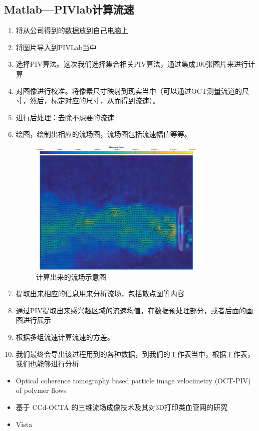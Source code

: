 \documentclass[12pt]{article}
\begin{document}
\subsection{Matlab—PIVlab计算流速}
\begin{enumerate}
    \item 将从公司得到的数据放到自己电脑上
    \item 将图片导入到PIVLab当中
    \item 选择PIV算法。这次我们选择集合相关PIV算法，通过集成100张图片来进行计算
    \item 对图像进行校准。将像素尺寸映射到现实当中（可以通过OCT测量流道的尺寸，然后，标定对应的尺寸，从而得到流速）。
    \item 进行后处理：去除不想要的流速
    \item 绘图，绘制出相应的流场图，流场图包括流速幅值等等。
    
    \begin{figure}[H]
        \centering
        \includegraphics[width=0.8\textwidth]{Images/经过Matlab处理后的图片.png}
        \caption{计算出来的流场示意图}
    \end{figure}
    
    \item 提取出来相应的信息用来分析流场，包括散点图等内容
    \item 通过PIV提取出来感兴趣区域的流速均值，在数据预处理部分，或者后面的画图进行展示
    \item 根据多组流速计算流速的方差。
    \item 我们最终会导出该过程用到的各种数据，到我们的工作表当中，根据工作表，我们也能够进行分析
\end{enumerate}



\begin{itemize}
    \item Optical coherence tomography based particle image velocimetry (OCT-PIV) of polymer flows
    \item 基于 CCd-OCTA 的三维流场成像技术及其对3D打印类血管网的研究 
    \item Vista
    \end{itemize}
\end{document}
